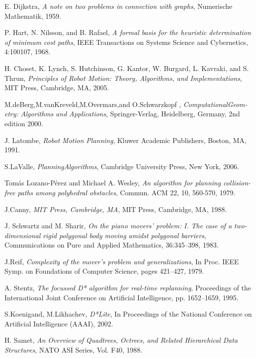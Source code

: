 \documentclass[MTech]{iitmdiss}
\begin{document}
\begin{thebibliography}{99}
	E. Dijkstra, 
  \emph{A note on two problems in connection with graphs},
	Numerische Mathematik,
  1959.

	P. Hart, N. Nilsson, and B. Rafael, 
  \emph{A formal basis for the heuristic determination of minimum cost paths},
	IEEE Transactions on Systems Science and Cybernetics, 4:100107,
	 1968.


	H. Choset, K. Lynch, S. Hutchinson, G. Kantor, W. Burgard, L. Kavraki, and S. Thrun,
  \emph{Principles of Robot Motion: Theory, Algorithms, and Implementations},
	MIT Press, Cambridge, MA,
	 2005.
	 
 M.deBerg,M.vanKreveld,M.Overmars,and O.Schwarzkopf ,
  \emph{ComputationalGeom- etry: Algorithms and Applications},
	Springer-Verlag, Heidelberg, Germany, 2nd edition
	 2000.

	J. Latombe,
  \emph{Robot Motion Planning},
	Kluwer Academic Publishers, Boston, MA,
	 1991.
	 
	S.LaValle,
  \emph{PlanningAlgorithms},
	Cambridge University Press, New York,
	 2006.

	Tomás Lozano-Pérez and Michael A. Wesley,
  \emph{An algorithm for planning collision-free paths among polyhedral obstacles},
	Commun. ACM 22, 10, 560-570,
	 1979.

  J.Canny,
  \emph{MIT Press, Cambridge, MA},
	MIT Press, Cambridge, MA,
	 1988.

	J. Schwartz and M. Sharir,
  \emph{On the piano movers’ problem: I. The case of a two-dimensional rigid polygonal body moving amidst polygonal barriers},
	Communications on Pure and Applied Mathematics, 36:345–398,
	 1983.

	J.Reif,
  \emph{Complexity of the mover’s problem and generalizations},
	 In Proc. IEEE Symp. on Foundations of Computer Science, pages 421–427,
	 1979.


	A. Stentz,
  \emph{The focussed D* algorithm for real-time replanning},
	 Proceedings of the International Joint Conference on Artificial Intelligence, pp. 1652–1659,
	 1995.

	S.Koenigand, M.Likhachev,
  \emph{D*Lite},
	 In Proceedings of the National Conference on Artificial Intelligence (AAAI),
	 2002.

	H. Samet,
  \emph{An Overview of Quadtrees, Octrees, and Related Hierarchical
Data Structures},
	 NATO ASI Series, Vol. F40,
	 1988.
	 

\end{thebibliography}
\end{document}
